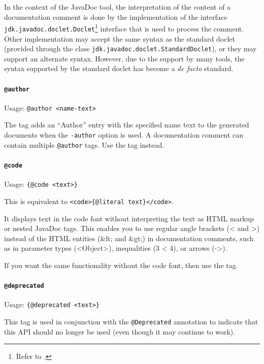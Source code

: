 \documentclass[11pt,a4paper, titlepage, parskip=half, headsepline, footsepline, cleardoublepage=current, headheight=1cm]{scrbook}
\begin{document}
In the context of the JavaDoc tool, the interpretation of the content of a documentation comment is done by the implementation of the interface \lstinline|jdk.javadoc.doclet.Doclet|\footnote{Refer to \autocite{ORACLE_DOC_DOCLET_INTERFACE}.} interface that is used to process the comment. Other implementation may accept the same syntax as the standard doclet (provided through the class \lstinline|jdk.javadoc.doclet.StandardDoclet|\autocite{ORACLE_DOC_STANDARDDOCLET_CLASS}), or they may support an alternate syntax. However, due to the support by many tools, the syntax supported by the standard doclet has become a \textit{de facto} standard.

\paragraph{\lstinline|@author|}\label{sec:TagAuthor} Usage: \lstinline|@author <name-text>|

The tag adds an “Author” entry with the specified name text to the generated documents when the \verb#-author# option is used. A documentation comment can contain multiple \lstinline|@author| tags. Use the  tag instead.

\paragraph{\lstinline|@code|}\label{sec:TagCode}  Usage: \lstinline|{@code <text>}|

This is equivalent to \lstinline|<code>{@literal text}</code>|.

It displays text in the code font without interpreting the text as HTML markup or nested JavaDoc tags. This enables you to use regular angle brackets (< and >) instead of the HTML entities (\&lt; and \&gt;) in documentation comments, such as in parameter types (<Object>), inequalities (3 < 4), or arrows (->).

If you want the same functionality without the code font, then use the  tag. 

\paragraph{\lstinline|@deprecated|}  Usage: \lstinline|{@deprecated <text>}|

This tag is used in conjunction with the \lstinline|@Deprecated|\autocite{ORACLE_DOC_DEPRECATED_ANNOTATION} annotation to indicate that this API should no longer be used (even though it may continue to work).
\end{document}
